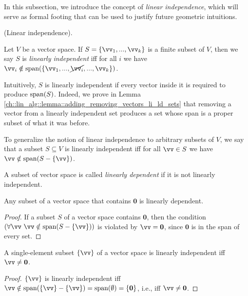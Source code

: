In this subsection, we introduce the concept of \textit{linear independence}, which will serve as formal footing that can be used to justify future geometric intuitions.

\begin{defn}
    (Linear independence).
    
    Let $V$ be a vector space. If $S = \{\vv_1, ..., \vv_k\}$ is a finite subset of $V$, then we say $S$ is \textit{linearly independent} iff for all $i$ we have $\vv_i \notin \spann(\{\vv_1, ..., \cancel{\vv_i}, ..., \vv_k\})$.
    
    Intuitively, $S$ is linearly independent if every vector inside it is required to produce $\text{span}(S)$. Indeed, we prove in Lemma \ref{ch::lin_alg::lemma::adding_removing_vectors_li_ld_sets} that removing a vector from a linearly independent set produces a set whose span is a proper subset of what it was before.
    
    To generalize the notion of linear independence to arbitrary subsets of $V$, we say that a subset $S \subseteq V$ is linearly independent iff for all $\vv \in S$ we have $\vv \notin \spann(S - \{\vv\})$.
    
    A subset of vector space is called \textit{linearly dependent} if it is not linearly independent.
\end{defn}

\begin{theorem}
    Any subset of a vector space that contains $\mathbf{0}$ is linearly dependent.
\end{theorem}

\begin{proof}
    If a subset $S$ of a vector space contains $\mathbf{0}$, then the condition $(\forall \vv \spc \vv \notin \spann(S - \{\vv\}))$ is violated by $\vv = \mathbf{0}$, since $\mathbf{0}$ is in the span of every set.
\end{proof}

\begin{theorem}
    A single-element subset $\{\vv\}$ of a vector space is linearly independent iff $\vv \neq \mathbf{0}$.
\end{theorem}

\begin{proof}
   $\{\vv\}$ is linearly independent iff $\vv \notin \spann(\{\vv\} - \{\vv\}) = \spann(\emptyset) = \{\mathbf{0}\}$, i.e., iff $\vv \neq \mathbf{0}$.
\end{proof}

